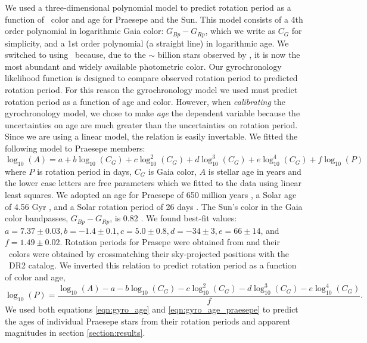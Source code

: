 We used a three-dimensional polynomial model to predict rotation period as a
function of \gaia\ color and age for Praesepe and the Sun.
This model consists of a 4th order polynomial in logarithmic Gaia color:
$G_{Bp} - G_{Rp}$, which we write as $C_G$ for simplicity, and a 1st order
polynomial (a straight line) in logarithmic age.
We switched to using \gcolor\ because, due to the $\sim$ billion stars
observed by \gaia, it is now the most abundant and widely available
photometric color.
Our gyrochronology likelihood function is designed to compare observed
rotation period to predicted rotation period.
For this reason the gyrochronology model we used must predict rotation period
as a function of age and color.
However, when {\it calibrating} the gyrochronology model, we chose to make
{\it age} the dependent variable because the uncertainties on age are much
greater than the uncertainties on rotation period.
Since we are using a linear model, the relation is easily invertable.
We fitted the following model to Praesepe members:
\begin{equation}
    \log_{10}(A) = a + b\log_{10}(C_G) + c\log_{10}^2(C_G) +
    d\log_{10}^3(C_G) + e\log_{10}^4(C_G) + f\log_{10}(P)
\label{eqn:gyro_age_praesepe}
\end{equation}
where $P$ is rotation period in days, $C_G$ is Gaia color, $A$ is stellar age
in years and the lower case letters are free parameters which we fitted to the
data using linear least squares.
We adopted an age for Praesepe of 650 million years , a
Solar age of 4.56 Gyr , and a Solar rotation period of 26
days .
The Sun's color in the Gaia color bandpasses, $G_{Bp} - G_{Rp}$, is 0.82
\citep{casagrande2018}.
We found best-fit values: $a = 7.37 \pm 0.03, b = -1.4 \pm 0.1, c = 5.0 \pm
0.8, d = -34 \pm 3, e = 66 \pm 14$, and $f = 1.49 \pm 0.02$.
Rotation periods for Prasepe were obtained from \citet{rebull} and their
\gaia\ colors were obtained by crossmatching their sky-projected positions
with the \gaia\ DR2 catalog.
We inverted this relation to predict rotation period as a function of color
and age,
\begin{equation}
    \log_{10}(P) = \frac{\log_{10}(A) - a - b\log_{10}(C_G) - c\log_{10}^2(C_G) -
    d\log_{10}^3(C_G) - e\log_{10}^4(C_G)}{f}.
\label{eqn:gyro_age_praesepe}
\end{equation}
We used both equations \ref{eqn:gyro_age} and \ref{eqn:gyro_age_praesepe} to
predict the ages of individual Praesepe stars from their rotation periods and
apparent magnitudes in section \ref{section:results}.

